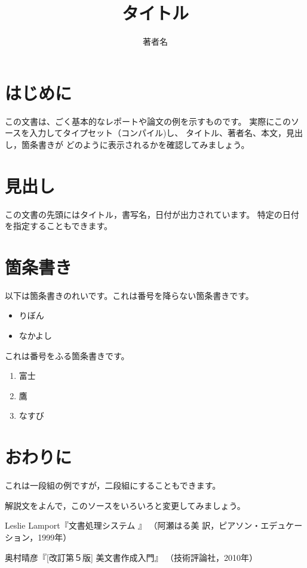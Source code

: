 \documentclass[twocolumn]{jsarticle}
\begin{document}
\title{タイトル}
\author{著者名}
\maketitle

\section{はじめに}

この文書は、ごく基本的なレポートや論文の例を示すものです。
実際にこのソースを入力してタイプセット（コンパイル)し、
タイトル、著者名、本文，見出し，箇条書きが
どのように表示されるかを確認してみましょう。

\section{見出し}

この文書の先頭にはタイトル，書写名，日付が出力されています。
特定の日付を指定することもできます。

\section{箇条書き}

以下は箇条書きのれいです。これは番号を降らない箇条書きです。

\begin{itemize}
  \item りぼん
  \item なかよし
\end{itemize}

これは番号をふる箇条書きです。

\begin{enumerate}
  \item 富士
  \item 鷹
  \item なすび
\end{enumerate}

\section{おわりに}

これは一段組の例ですが，二段組にすることもできます。

解説文をよんで，このソースをいろいろと変更してみましょう。

\begin{thebibliography}{99}
\item
  Leslie Lamport『文書処理システム \LaTeXe』
  （阿瀬はる美 訳，ピアソン・エデュケーション，1999年）
\item
  奥村晴彦『[改訂第５版] \LaTeXe 美文書作成入門』
  （技術評論社，2010年）
\end{thebibliography}
\end{document}
